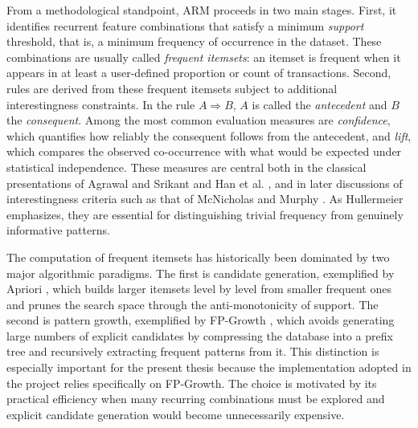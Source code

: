 From a methodological standpoint, ARM proceeds in two main stages. First, it identifies recurrent feature combinations that satisfy a minimum \emph{support} threshold, that is, a minimum frequency of occurrence in the dataset. These combinations are usually called \emph{frequent itemsets}: an itemset is frequent when it appears in at least a user-defined proportion or count of transactions. Second, rules are derived from these frequent itemsets subject to additional interestingness constraints. In the rule $A \Rightarrow B$, $A$ is called the \emph{antecedent} and $B$ the \emph{consequent}. Among the most common evaluation measures are \emph{confidence}, which quantifies how reliably the consequent follows from the antecedent, and \emph{lift}, which compares the observed co-occurrence with what would be expected under statistical independence. These measures are central both in the classical presentations of Agrawal and Srikant \cite{agrawal1994fast} and Han et al. \cite{han2000mining}, and in later discussions of interestingness criteria such as that of McNicholas and Murphy \cite{mcnicholas2008lift}. As Hullermeier \cite{hullermeier2006association} emphasizes, they are essential for distinguishing trivial frequency from genuinely informative patterns.

The computation of frequent itemsets has historically been dominated by two major algorithmic paradigms. The first is candidate generation, exemplified by Apriori \cite{agrawal1994fast}, which builds larger itemsets level by level from smaller frequent ones and prunes the search space through the anti-monotonicity of support. The second is pattern growth, exemplified by FP-Growth \cite{han2000mining}, which avoids generating large numbers of explicit candidates by compressing the database into a prefix tree and recursively extracting frequent patterns from it. This distinction is especially important for the present thesis because the implementation adopted in the project relies specifically on FP-Growth. The choice is motivated by its practical efficiency when many recurring combinations must be explored and explicit candidate generation would become unnecessarily expensive.

